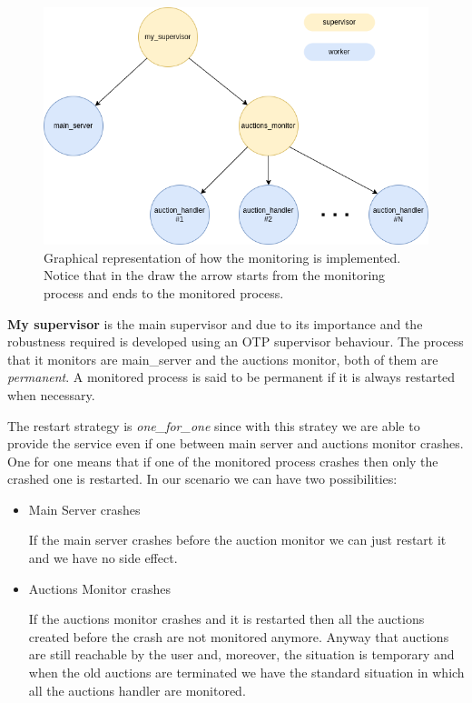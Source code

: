 \begin{figure}[H]
	\centering
	\includegraphics[width=0.7\linewidth]{img/monitorAndSupervisor.png}
	\caption{Graphical representation of how the monitoring is implemented. Notice that in the draw the arrow starts from the monitoring process and ends to the monitored process.}
	\label{fig:monitor}
\end{figure}


\textbf{My supervisor} is the main supervisor and due to its importance and the robustness required is developed using an OTP supervisor behaviour. The process that it monitors are main\_server and the auctions monitor, both of them are \textit{permanent}. A monitored process is said to be permanent if it is always restarted when necessary.
	
\noindent The restart strategy is \textit{one\_for\_one} since with this stratey we are able to provide the service even if one between main server and auctions monitor crashes. One for one means that if one of the monitored process crashes then only the crashed one is restarted. In our scenario we can have two possibilities:

\begin{itemize}
	\item Main Server crashes
	
	\noindent If the main server crashes before the auction monitor we can just restart it and we have no side effect.
	
	\item Auctions Monitor crashes
	
	\noindent If the auctions monitor crashes and it is restarted then all the auctions created before the crash are not monitored anymore. Anyway that auctions are still reachable by the user and, moreover, the situation is temporary and when the old auctions are terminated we have the standard situation in which all the auctions handler are monitored.
\end{itemize}

